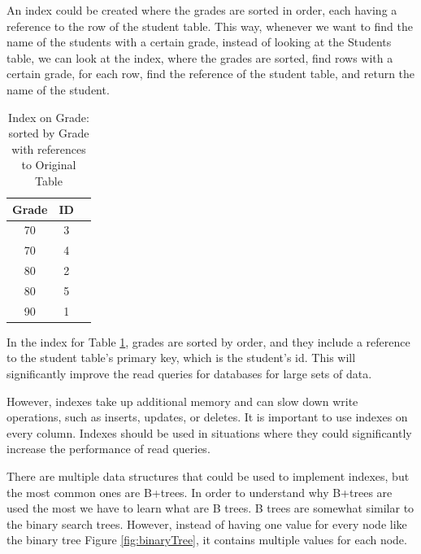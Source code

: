 An index could be created where the grades are sorted in order, each having a reference to the row of the student table.
This way, whenever we want to find the name of the students with a certain grade, instead of looking at the Students table, we can look at the index,
where the grades are sorted, find rows with a certain grade, for each row, find the reference of the student table, and return the name of the student.

\begin{table}[H]
\centering
\begin{tabular}{|c|c|c|}
\hline
\textbf{Grade} & \textbf{ID}  \\ \hline
70 & 3  \\ \hline
70 & 4  \\ \hline
80 & 2  \\ \hline
80 & 5  \\ \hline
90 & 1  \\ \hline
\end{tabular}
\caption{Index on Grade: sorted by Grade with references to Original Table}
\label{tab:students_index}
\end{table}

In the index for Table \ref{tab:students_index}, grades are sorted by order, and they include a reference to the student table's primary key, which is the student's id.
This will significantly improve the read queries for databases for large sets of data.

However, indexes take up additional memory and can slow down write operations, such as inserts, updates, or deletes. It is important to use indexes on every column.
Indexes should be used in situations where they could significantly increase the performance of read queries.

There are multiple data structures that could be used to implement indexes,
but the most common ones are B+trees. In order to understand why B+trees are used the most we have to learn what are B trees.
B trees are somewhat similar to the binary search trees.
However, instead of having one value for every node like the binary tree Figure \ref{fig:binaryTree}, it contains multiple values for each node.
\binaryTreeFigure
\bTreeFigure

